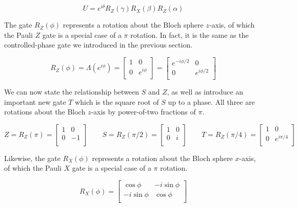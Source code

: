 \begin{equation*}
U = e^{i\delta}R_Z(\gamma)R_X(\beta)R_Z(\alpha)
\end{equation*}

The gate $R_Z(\phi)$ represents a rotation about the Bloch sphere $z$-axis,
of which the Pauli $Z$ gate is a special case of a $\pi$ rotation. In fact,
it is the same as the controlled-phase gate we introduced in the previous section.

\begin{equation}
R_Z(\phi) = \Lambda(e^{i\phi}) =
\left[
  \begin{array}{cc}
    1 & 0 \\
    0 & e^{i\phi} \\
  \end{array} \right]
=
\left[
  \begin{array}{cc}
    e^{-i\phi/2} & 0 \\
    0 & e^{i\phi/2} \\
  \end{array} \right]
\end{equation}

We can now state the relationship between $S$ and $Z$, as well as introduce
an important new gate $T$ which is the square root of $S$ up to a phase. All three
are rotations about the Bloch $z$-axis by power-of-two fractions of $\pi$.

\begin{equation}
Z = R_Z(\pi) =
\left[
  \begin{array}{cc}
    1 & 0 \\
    0 & -1 \\
  \end{array} \right]
\qquad
S = R_Z(\pi/2) =
\left[
  \begin{array}{cc}
    1 & 0 \\
    0 & i \\
  \end{array} \right]
\qquad
T = R_Z(\pi/4) =
\left[
  \begin{array}{cc}
    1 & 0 \\
    0 & e^{i\pi / 4} \\
  \end{array} \right]
\end{equation}

Likewise, the gate $R_X(\phi)$ represents a rotation about the Bloch sphere $x$-axis,
of which the Pauli $X$ gate is a special case of a $\pi$ rotation.

\begin{equation}
R_X(\phi) =
\left[
  \begin{array}{cc}
    \cos \phi & -i \sin \phi \\
    -i \sin \phi & \cos \phi \\
  \end{array} \right]
\end{equation}

